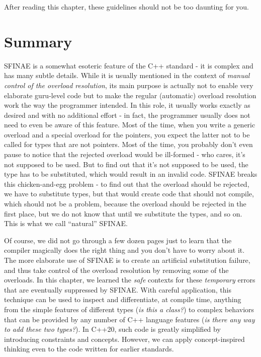 After reading this chapter, these guidelines should not be too daunting for you.

\section{Summary}

SFINAE is a somewhat esoteric feature of the C++ standard - it is complex and has many subtle details. While it is usually mentioned in the context of \emph{manual control of the overload resolution}, its main purpose is actually not to enable very elaborate guru-level code but to make the regular (automatic) overload resolution work the way the programmer intended. In this role, it usually works exactly as desired and with no additional effort - in fact, the programmer usually does not need to even be aware of this feature. Most of the time, when you write a generic overload and a special overload for the pointers, you expect the latter not to be called for types that are not pointers. Most of the time, you probably don't even pause to notice that the rejected overload would be ill-formed - who cares, it's not supposed to be used. But to find out that it's not supposed to be used, the type has to be substituted, which would result in an invalid code. SFINAE breaks this chicken-and-egg problem - to find out that the overload should be rejected, we have to substitute types, but that would create code that should not compile, which should not be a problem, because the overload should be rejected in the first place, but we do not know that until we substitute the types, and so on. This is what we call ``natural'' SFINAE.

Of course, we did not go through a few dozen pages just to learn that the compiler magically does the right thing and you don't have to worry about it. The more elaborate use of SFINAE is to create an artificial substitution failure, and thus take control of the overload resolution by removing some of the overloads. In this chapter, we learned the \emph{safe} contexts for these \emph{temporary} errors that are eventually suppressed by SFINAE. With careful application, this technique can be used to inspect and differentiate, at compile time, anything from the simple features of different types (\emph{is this a class?}) to complex behaviors that can be provided by any number of C++ language features (\emph{is there any way to add these two types?}). In C++20, such code is greatly simplified by introducing constraints and concepts. However, we can apply concept-inspired thinking even to the code written for earlier standards.

